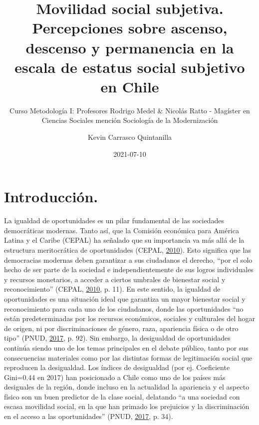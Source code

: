 \documentclass[
]{article}
\title{\vspace{5cm} Movilidad social subjetiva. Percepciones sobre ascenso,
descenso y permanencia en la escala de estatus social subjetivo en Chile}
\subtitle{Curso Metodología I: Profesores Rodrigo Medel \& Nicolás Ratto -
Magíster en Ciencias Sociales mención Sociología de la Modernización}
\author{Kevin Carrasco Quintanilla}
\date{2021-07-10}
\begin{document}
\maketitle

\newpage

\hypertarget{introducciuxf3n.}{%
\section{Introducción.}\label{introducciuxf3n.}}

La igualdad de oportunidades es un pilar fundamental de las sociedades
democráticas modernas. Tanto así, que la Comisión económica para América
Latina y el Caribe (CEPAL) ha señalado que su importancia va más allá de
la estructura meritocrática de oportunidades (CEPAL,
\protect\hyperlink{ref-cepal_hora_2010}{2010}). Esto significa que las
democracias modernas deben garantizar a sus ciudadanos el derecho, ``por
el solo hecho de ser parte de la sociedad e independientemente de sus
logros individuales y recursos monetarios, a acceder a ciertos umbrales
de bienestar social y reconocimiento'' (CEPAL,
\protect\hyperlink{ref-cepal_hora_2010}{2010}, p. 11). En este sentido,
la igualdad de oportunidades es una situación ideal que garantiza un
mayor bienestar social y reconocimiento para cada uno de los ciudadanos,
donde las oportunidades ``no están predeterminadas por los recursos
económicos, sociales y culturales del hogar de origen, ni por
discriminaciones de género, raza, apariencia física o de otro tipo''
(PNUD, \protect\hyperlink{ref-pnud_Desiguales_2017}{2017}, p. 92). Sin
embargo, la desigualdad de oportunidades continúa siendo uno de los
temas principales en el debate público, tanto por sus consecuencias
materiales como por las distintas formas de legitimación social que
reproducen la desigualdad. Los índices de desigualdad (por ej.
Coeficiente Gini=0.44 en 2017) han posicionado a Chile como uno de los
países más desiguales de la región, donde incluso en la actualidad la
apariencia y el aspecto físico son un buen predictor de la clase social,
delatando ``a una sociedad con escasa movilidad social, en la que han
primado los prejuicios y la discriminación en el acceso a las
oportunidades'' (PNUD,
\protect\hyperlink{ref-pnud_Desiguales_2017}{2017}, p. 34).
\end{document}
